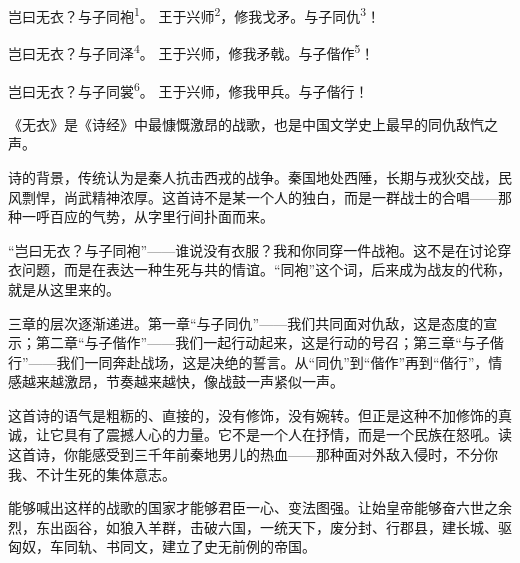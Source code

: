 
\begin{poem}
岂曰无衣？与子同袍\textsuperscript{1}。
王于兴师\textsuperscript{2}，修我戈矛。与子同仇\textsuperscript{3}！

岂曰无衣？与子同泽\textsuperscript{4}。
王于兴师，修我矛戟。与子偕作\textsuperscript{5}！

岂曰无衣？与子同裳\textsuperscript{6}。
王于兴师，修我甲兵。与子偕行！
\end{poem}

\begin{annotations}
\end{annotations}

\begin{appreciation}
《无衣》是《诗经》中最慷慨激昂的战歌，也是中国文学史上最早的同仇敌忾之声。

诗的背景，传统认为是秦人抗击西戎的战争。秦国地处西陲，长期与戎狄交战，民风剽悍，尚武精神浓厚。这首诗不是某一个人的独白，而是一群战士的合唱——那种一呼百应的气势，从字里行间扑面而来。

“岂曰无衣？与子同袍”——谁说没有衣服？我和你同穿一件战袍。这不是在讨论穿衣问题，而是在表达一种生死与共的情谊。“同袍”这个词，后来成为战友的代称，就是从这里来的。

三章的层次逐渐递进。第一章“与子同仇”——我们共同面对仇敌，这是态度的宣示；第二章“与子偕作”——我们一起行动起来，这是行动的号召；第三章“与子偕行”——我们一同奔赴战场，这是决绝的誓言。从“同仇”到“偕作”再到“偕行”，情感越来越激昂，节奏越来越快，像战鼓一声紧似一声。

这首诗的语气是粗粝的、直接的，没有修饰，没有婉转。但正是这种不加修饰的真诚，让它具有了震撼人心的力量。它不是一个人在抒情，而是一个民族在怒吼。读这首诗，你能感受到三千年前秦地男儿的热血——那种面对外敌入侵时，不分你我、不计生死的集体意志。

能够喊出这样的战歌的国家才能够君臣一心、变法图强。让始皇帝能够奋六世之余烈，东出函谷，如狼入羊群，击破六国，一统天下，废分封、行郡县，建长城、驱匈奴，车同轨、书同文，建立了史无前例的帝国。
\end{appreciation}
